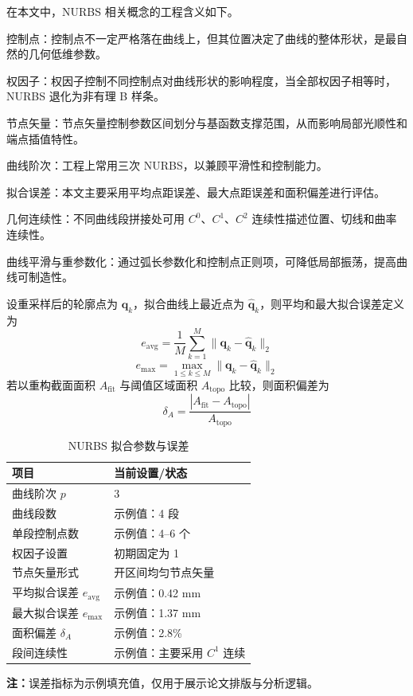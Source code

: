 \documentclass{FRB-style}
\begin{document}
在本文中，NURBS 相关概念的工程含义如下。

控制点：控制点不一定严格落在曲线上，但其位置决定了曲线的整体形状，是最自然的几何低维参数。

权因子：权因子控制不同控制点对曲线形状的影响程度，当全部权因子相等时，NURBS 退化为非有理 B 样条。

节点矢量：节点矢量控制参数区间划分与基函数支撑范围，从而影响局部光顺性和端点插值特性。

曲线阶次：工程上常用三次 NURBS，以兼顾平滑性和控制能力。

拟合误差：本文主要采用平均点距误差、最大点距误差和面积偏差进行评估。

几何连续性：不同曲线段拼接处可用 $C^0$、$C^1$、$C^2$ 连续性描述位置、切线和曲率连续性。

曲线平滑与重参数化：通过弧长参数化和控制点正则项，可降低局部振荡，提高曲线可制造性。

设重采样后的轮廓点为 $\mathbf{q}_k$，拟合曲线上最近点为 $\hat{\mathbf{q}}_k$，则平均和最大拟合误差定义为
\begin{equation}
e_{\text{avg}}=\frac{1}{M}\sum_{k=1}^{M}\|\mathbf{q}_k-\hat{\mathbf{q}}_k\|_2
\end{equation}
\begin{equation}
e_{\max}=\max_{1\le k\le M}\|\mathbf{q}_k-\hat{\mathbf{q}}_k\|_2
\end{equation}
若以重构截面面积 $A_{\text{fit}}$ 与阈值区域面积 $A_{\text{topo}}$ 比较，则面积偏差为
\begin{equation}
\delta_A=
\frac{|A_{\text{fit}}-A_{\text{topo}}|}{A_{\text{topo}}}
\end{equation}

\begin{table}[H]
\centering
\caption{NURBS 拟合参数与误差}
\begin{tabular}{ll}
\toprule
项目 & 当前设置/状态 \\
\midrule
曲线阶次 $p$ & 3 \\
曲线段数 & 示例值：4 段 \\
单段控制点数 & 示例值：4--6 个 \\
权因子设置 & 初期固定为 1 \\
节点矢量形式 & 开区间均匀节点矢量 \\
平均拟合误差 $e_{\text{avg}}$ & 示例值：0.42 mm \\
最大拟合误差 $e_{\max}$ & 示例值：1.37 mm \\
面积偏差 $\delta_A$ & 示例值：2.8\% \\
段间连续性 & 示例值：主要采用 $C^1$ 连续 \\
\bottomrule
\end{tabular}

\vspace{1mm}
\noindent\textbf{注：}误差指标为示例填充值，仅用于展示论文排版与分析逻辑。
\end{table}
\end{document}
